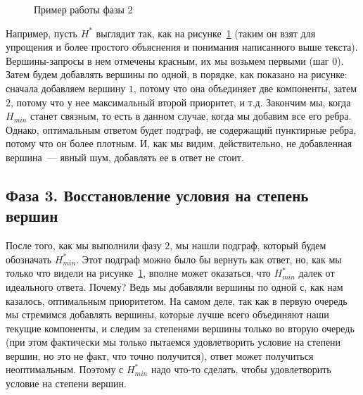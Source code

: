 \documentclass[11pt,a4paper,oneside]{article}
\begin{document}
\begin{figure}[!h]
\caption{Пример работы фазы $2$}\label{phase2-example}
\centering
  \begin{center}
  \end{center}
\end{figure}

Например, пусть $H^*$ выглядит так, как на рисунке~\ref{phase2-example} (таким он взят для упрощения и более простого объяснения и понимания написанного выше текста). Вершины-запросы в нем отмечены красным, их мы возьмем первыми (шаг $0$). Затем будем добавлять вершины по одной, в порядке, как показано на рисунке: сначала добавляем вершину $1$, потому что она объединяет две компоненты, затем $2$, потому что у нее максимальный второй приоритет, и т.д. Закончим мы, когда $H_{min}$ станет связным, то есть в данном случае, когда мы добавим все его ребра. Однако, оптимальным ответом будет подграф, не содержащий пунктирные ребра, потому что он более плотным. И, как мы видим, действительно, не добавленная вершина~--- явный шум, добавлять ее в ответ не стоит.

\subsection{Фаза 3. Восстановление условия на степень вершин}

После того, как мы выполнили фазу $2$, мы нашли подграф, который будем обозначать $H_{min}^*$. Этот подграф можно было бы вернуть как ответ, но, как мы только что видели на рисунке~\ref{phase2-example}, вполне может оказаться, что $H_{min}^*$ далек от идеального ответа. Почему? Ведь мы добавляли вершины по одной с, как нам казалось, оптимальным приоритетом. На самом деле, так как в первую очередь мы стремимся добавлять вершины, которые лучше всего объединяют наши текущие компоненты, и следим за степенями вершины только во вторую очередь (при этом фактически мы только пытаемся удовлетворить условие на степени вершин, но это не факт, что точно получится), ответ может получиться неоптимальным. Поэтому с $H_{min}^*$ надо что-то сделать, чтобы удовлетворить условие на степени вершин.
\end{document}
